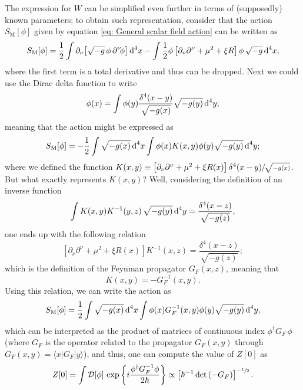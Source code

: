 The expression for $W$ can be simplified even further in terms of (supposedly) known parameters; to obtain such representation, consider that the action $S_\text{M}[\phi]$ given by equation \ref{eq: General scalar field action} can be written as
\begin{equation}
	S_\text{M}[\phi]=\frac{1}{2}\int\partial_\nu\!\left[\sqrt{-g}\,\phi\,\partial^\nu\!\phi\right]\text{d}^4x-\int\frac{1}{2}\phi\left[\partial_\nu\partial^\nu+\mu^2+\xi R\right]\phi\,\sqrt{-g}\,\text{d}^4x,
\end{equation}
where the first term is a total derivative and thus can be dropped. Next we could use the Dirac delta function to write
\begin{equation}
	\phi(x)=\int\phi(y)\frac{\delta^4(x-y)}{\sqrt{-g(x)}}\sqrt{-g(y)}\,\text{d}^4 y;
\end{equation}
meaning that the action might be expressed as
\begin{equation}
	S_\text{M}[\phi]=-\frac{1}{2}\int\sqrt{-g(x)}\,\text{d}^4x\int\phi(x)K(x,y)\phi(y)\sqrt{-g(y)}\,\text{d}^4 y;
\end{equation}
where we defined the function
$K(x,y)\equiv \left[\partial_\nu\partial^\nu+\mu^2+\xi R(x)\right]\delta^4(x-y)\sfrac{}{\sqrt{-g(x)}}$. But what exactly represents $K(x,y)$? Well, considering the definition of an inverse function
\begin{equation}
	\int K(x,y)K^{-1}(y,z)\,\sqrt{-g(y)}\,\text{d}^4y=\frac{\delta^4(x-z)}{\sqrt{-g(z)}},
\end{equation}
one ends up with the following relation
\begin{equation}
	\left[\partial_\nu\partial^\nu+\mu^2+\xi R(x)\right]K^{-1}(x,z)=\frac{\delta^4(x-z)}{\sqrt{-g(z)}};
\end{equation}
which is the definition of the Feynman propagator $G_F(x,z)$, meaning that
\begin{equation}
	K(x,y)=-G_F^{-1}(x,y).
\end{equation}
Using this relation, we can write the action as
\begin{equation}
	S_\text{M}[\phi]=\frac{1}{2}\int\sqrt{-g(x)}\,\text{d}^4x\int\phi(x)G_F^{-1}(x,y)\phi(y)\sqrt{-g(y)}\,\text{d}^4 y,
\end{equation}
which can be interpreted as the product of matrices of continuous index $\phi^\dagger G_F\,\phi$ (where $G_F$ is the operator related to the propagator $G_F(x,y)$ through $G_F(x,y)=\langle x|G_F|y\rangle$), and thus, one can compute the value of $Z[0]$ as
\begin{equation}
	Z[0]=\int\mathcal{D}[\phi]\,\exp{\left\{i\frac{\phi^\dagger G_F^{-1}\phi}{2\hbar}\right\}}\propto\left[\hbar^{-1}\,\text{det}\left(-G_F\right)\right]^{-\sfrac{1}{2}}.
\end{equation}
